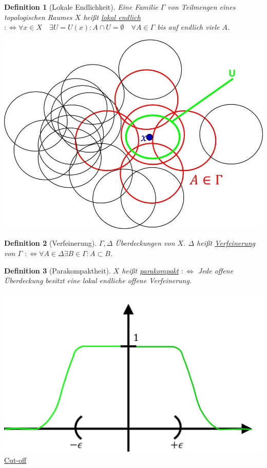 \documentclass[a4paper,11pt,notitlepage]{report}
\newtheorem{definition}{Definition}[chapter]
\begin{document}
\begin{definition}[Lokale Endlichkeit]
	Eine Familie $\Gamma$ von Teilmengen eines topologischen Raumes $X$ heißt \underline{lokal endlich} $:\Leftrightarrow \forall x \in X \quad \exists U = U(x) \colon A \cap U = \emptyset \quad \forall A \in \Gamma$ bis auf endlich viele $A$.
\end{definition}
\begin{center}
	\includegraphics[scale=0.5]{images/lokal_endlich.jpg}
\end{center} 
 
\begin{definition}[Verfeinerung]
	$\Gamma, \Delta$ Überdeckungen von $X$. $\Delta$ heißt \underline{Verfeinerung} von $\Gamma$ \newline $:\Leftrightarrow \forall A \in \Delta \exists B \in \Gamma \colon A \subset B$.
\end{definition} 

\begin{definition}[Parakompaktheit]
	$X$ heißt \underline{parakompakt} $:\Leftrightarrow$ Jede offene Überdeckung besitzt eine lokal endliche offene Verfeinerung. 
\end{definition}

\includegraphics[scale=0.5]{images/Cutoff.jpg} \underline{\underline{Cut-off}}
\end{document}
